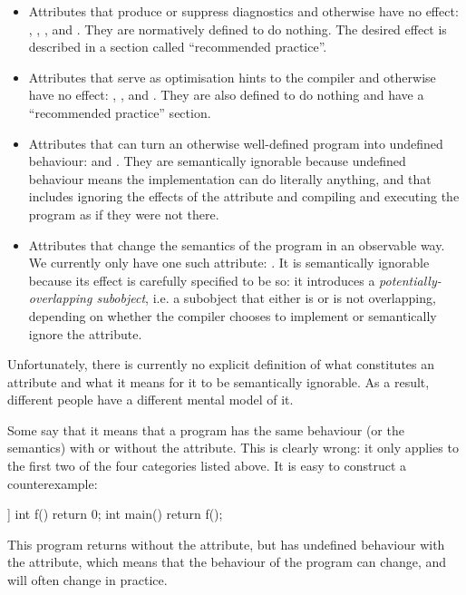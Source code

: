 \begin{itemize}
\item Attributes that produce or suppress diagnostics and otherwise have no effect: , , , and . They are normatively defined to do nothing. The desired effect is described in a section called ``recommended practice''.
\item Attributes that serve as optimisation hints to the compiler and otherwise have no effect: , , and . They are also defined to do nothing and have a ``recommended practice'' section.
\item Attributes that can turn an otherwise well-defined program into undefined behaviour:  and . They are semantically ignorable because undefined behaviour means the implementation can do literally anything, and that includes ignoring the effects of the attribute and compiling and executing the program as if they were not there.
\item Attributes that change the semantics of the program in an observable way. We currently only have one such attribute: . It is semantically ignorable because its effect is carefully specified to be so: it introduces a \emph{potentially-overlapping subobject}, i.e. a subobject that either is or is not overlapping, depending on whether the compiler chooses to implement or semantically ignore the attribute.
\end{itemize}

Unfortunately, there is currently no explicit definition of what constitutes an attribute and what it means for it to be semantically ignorable. As a result, different people have a different mental model of it.

Some say that it means that a program has the same behaviour (or the semantics) with or without the attribute. This is clearly wrong: it only applies to the first two of the four categories listed above. It is easy to construct a counterexample:

\begin{codeblock}
[[noreturn]] int f() { return 0; }
int main() { return f(); }
\end{codeblock}

This program returns  without the attribute, but has undefined behaviour with the attribute, which means that the behaviour of the program can change, and will often change in practice.

